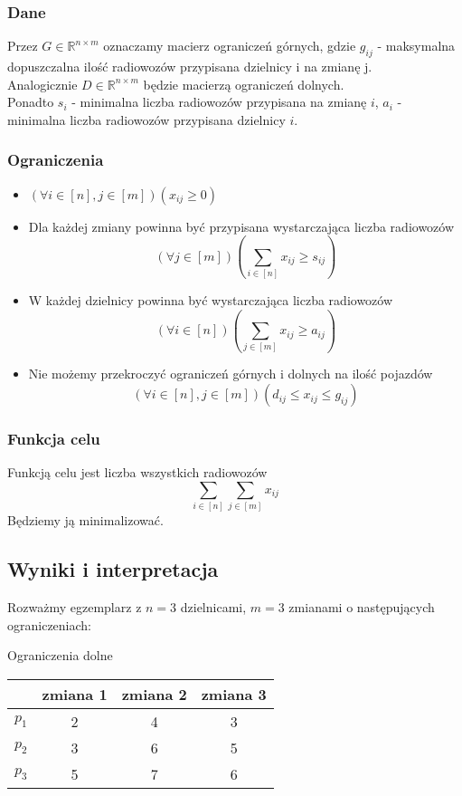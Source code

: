 \documentclass{article}
\begin{document}
\subsubsection{Dane}
Przez \(G\in\mathbb{R}^{n\times m}\) oznaczamy macierz ograniczeń górnych, gdzie \(g_{ij}\) - maksymalna dopuszczalna ilość radiowozów przypisana dzielnicy i na zmianę j. \\
Analogicznie \(D\in\mathbb{R}^{n\times m}\) będzie macierzą ograniczeń dolnych. \\
Ponadto \(s_i\) - minimalna liczba radiowozów przypisana na zmianę \(i\), \(a_i\) - minimalna liczba radiowozów przypisana dzielnicy \(i\).
\subsubsection{Ograniczenia}
\begin{itemize}
    \item \((\forall i\in [n], j\in[m])(x_{ij} \geq 0)\)
    \item Dla każdej zmiany powinna być przypisana wystarczająca liczba radiowozów
    \[(\forall j\in [m])(\sum_{i\in[n]}x_{ij} \geq s_{ij})\]
    \item W każdej dzielnicy powinna być wystarczająca liczba radiowozów
    \[(\forall i\in [n])(\sum_{j\in[m]}x_{ij} \geq a_{ij})\]
    \item Nie możemy przekroczyć ograniczeń górnych i dolnych na ilość pojazdów
    \[(\forall i\in[n], j\in[m])(d_{ij} \leq x_{ij} \leq g_{ij})\]
\end{itemize}

\subsubsection{Funkcja celu}
Funkcją celu jest liczba wszystkich radiowozów
\[\sum_{i\in[n]} \sum_{j\in[m]} x_{ij}\]
Będziemy ją minimalizować.

\subsection{Wyniki i interpretacja}
Rozważmy egzemplarz z \(n = 3\) dzielnicami, \(m = 3\) zmianami o następujących ograniczeniach:
\begin{center}
Ograniczenia dolne
\end{center}
\begin{center}
\begin{tabular}{c c c c}
 & zmiana 1 & zmiana 2 & zmiana 3\\
 \hline
$p_1$ & 2 & 4 & 3\\
\hline
$p_2$ & 3 & 6 & 5 \\
\hline
$p_3$ & 5 & 7 & 6 \\
\hline
\end{tabular}
\end{center}
\end{document}
